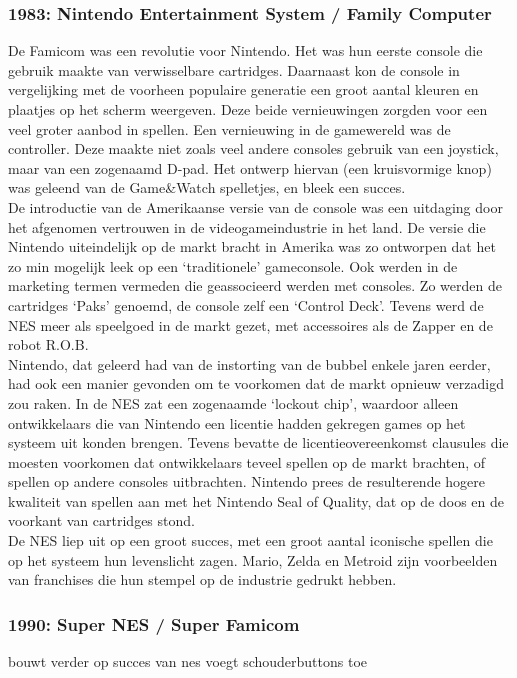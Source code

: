\documentclass{article}
\begin{document}
\subsubsection{1983: Nintendo Entertainment System / Family Computer}
De Famicom was een revolutie voor Nintendo. Het was hun eerste console die gebruik maakte van verwisselbare cartridges. Daarnaast kon de console in vergelijking met de voorheen populaire generatie een groot aantal kleuren en plaatjes op het scherm weergeven. Deze beide vernieuwingen zorgden voor een veel groter aanbod in spellen.
Een vernieuwing in de gamewereld was de controller. Deze maakte niet zoals veel andere consoles gebruik van een joystick, maar van een zogenaamd D-pad. Het ontwerp hiervan (een kruisvormige knop) was geleend van de Game\&Watch spelletjes, en bleek een succes. \\ 
De introductie van de Amerikaanse versie van de console was een uitdaging door het afgenomen vertrouwen in de videogameindustrie in het land. De versie die Nintendo uiteindelijk op de markt bracht in Amerika was zo ontworpen dat het zo min mogelijk leek op een `traditionele' gameconsole. Ook werden in de marketing termen vermeden die geassocieerd werden met consoles. Zo werden de cartridges `Paks' genoemd, de console zelf een `Control Deck'. Tevens werd de NES meer als speelgoed in de markt gezet, met accessoires als de Zapper en de robot R.O.B. \\ 
Nintendo, dat geleerd had van de instorting van de bubbel enkele jaren eerder, had ook een manier gevonden om te voorkomen dat de markt opnieuw verzadigd zou raken. In de NES zat een zogenaamde `lockout chip', waardoor alleen ontwikkelaars die van Nintendo een licentie hadden gekregen games op het systeem uit konden brengen. Tevens bevatte de licentieovereenkomst clausules die moesten voorkomen dat ontwikkelaars teveel spellen op de markt brachten, of spellen op andere consoles uitbrachten. Nintendo prees de resulterende hogere kwaliteit van spellen aan met het Nintendo Seal of Quality, dat op de doos en de voorkant van cartridges stond.\\ 
De NES liep uit op een groot succes, met een groot aantal iconische spellen die op het systeem hun levenslicht zagen. Mario, Zelda en Metroid zijn voorbeelden van franchises die hun stempel op de industrie gedrukt hebben.

\subsubsection{1990: Super NES / Super Famicom}
bouwt verder op succes van nes
voegt schouderbuttons toe
\end{document}
